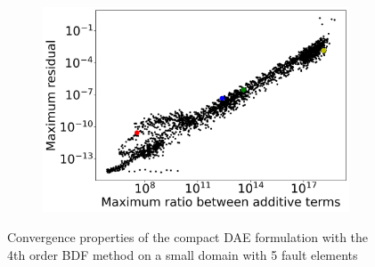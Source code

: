 \begin{figure}[H]
\begin{subfigure}[t]{0.32\textwidth}
		\includegraphics[width=1\textwidth]{images/TANDEMConvergenceAnalysisCompactDAERatioInAddition_Size5.png}
		\label{fig:convergenceIssuesCompactDAEMaxResidual_vs_ratio}
	\end{subfigure}
	\caption{Convergence properties of the compact DAE formulation with the 4th order BDF method on a small domain with 5 fault elements}
\end{figure}

